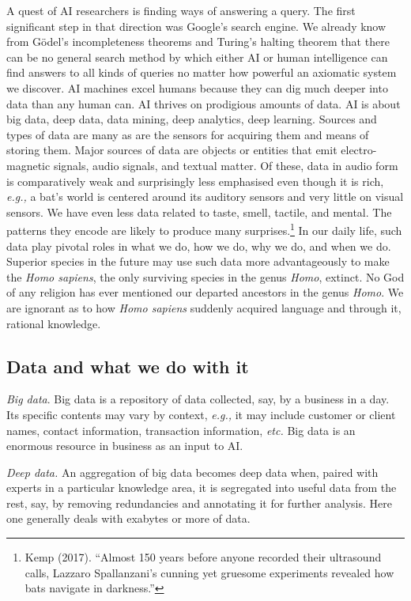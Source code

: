 \begin{multicols}{2}
A quest of AI researchers is finding ways of answering a query. The first significant step in that direction was Google's search engine. We already know from Gödel's incompleteness theorems and Turing's halting theorem that there can be no general search method by which either AI or human intelligence can find answers to all kinds of queries no matter how powerful an axiomatic system we discover. AI machines excel humans because they can dig much deeper into data than any human can. AI thrives on prodigious amounts of data. AI is about big data, deep data, data mining, deep analytics, deep learning. Sources and types of data are many as are the sensors for acquiring them and means of storing them. Major sources of data are objects or entities that emit electro-magnetic signals, audio signals, and textual matter. Of these, data in audio form is comparatively weak and surprisingly less emphasised even though it is rich, \textit{e.g.,} a bat's world is centered around its auditory sensors and very little on visual sensors. We have even less data related to taste, smell, tactile, and mental. The patterns they encode are likely to produce many surprises.\footnote{Kemp (2017). “Almost 150 years before anyone recorded their ultrasound calls, Lazzaro Spallanzani's cunning yet gruesome experiments revealed how bats navigate in darkness.”}  In our daily life, such data play pivotal roles in what we do, how we do, why we do, and when we do. Superior species in the future may use such data more advantageously to make the \textit{Homo sapiens}, the only surviving species in the genus \textit{Homo}, extinct. No God of any religion has ever mentioned our departed ancestors in the genus \textit{Homo}. We are ignorant as to how \textit{Homo sapiens} suddenly acquired language and through it, rational knowledge. 

\subsection{Data and what we do with it}

\textit{Big data}. Big data is a repository of data collected, say, by a business in a day. Its specific contents may vary by context, \textit{e.g.,} it may include customer or client names, contact information, transaction information, \textit{etc.} Big data is an enormous resource in business as an input to AI.

\textit{Deep data.} An aggregation of big data becomes deep data when, paired with experts in a particular knowledge area, it is segregated into useful data from the rest, say, by removing redundancies and annotating it for further analysis. Here one generally deals with exabytes or more of data. 


\end{multicols}
